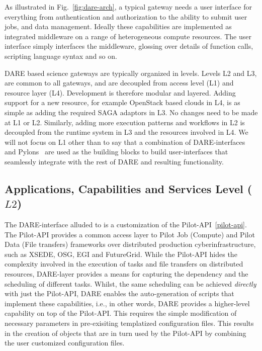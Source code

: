 \documentclass[]{svjour3}
\begin{document}
As illustrated in Fig.~\ref{fig:dare-arch}, a typical gateway needs a
user interface for everything from authentication and authorization to
the ability to submit user jobs, and data management.  Ideally these
capabilities are implemented as integrated middleware on a range of
heterogeneous compute resources. The user interface simply interfaces
the middleware, glossing over details of function calls, scripting
language syntax and so on.

DARE based science gateways are typically organized in levels.  Levels
L2 and L3, are common to all gateways, and are decoupled from access
level (L1) and resource layer (L4). Development is therefore modular
and layered. Adding support for a new resource, for example OpenStack
based clouds in L4, is as simple as adding the required SAGA adaptors
in L3. No changes need to be made at L1 or L2. Similarly, adding more
execution patterns and workflows in L2 is decoupled from the runtime
system in L3 and the resources involved in L4.  We will not focus on
L1 other than to say that a combination of DARE-interfaces and
Pylons~\cite{pylons_website} are used as the building blocks to build
user-interfaces that seamlessly integrate with the rest of DARE and
resulting functionality.





\subsection{Applications, Capabilities and Services Level ($L2$)} 


The DARE-interface alluded to is a customization of the
Pilot-API~\ref{pilot-api}. The Pilot-API provides a common access
layer to Pilot Job (Compute) and Pilot Data (File transfers)
frameworks over distributed production cyberinfrastructure, such as
XSEDE, OSG, EGI and FutureGrid.  While the Pilot-API hides the
complexity involved in the execution of tasks and file transfers on
distributed resources, DARE-layer provides a means for capturing the
dependency and the scheduling of different tasks.  Whilst, the same
scheduling can be achieved {\it directly} with just the Pilot-API,
DARE enables the auto-generation of scripts that implement these
capabilities, i.e., in other words, DARE provides a higher-level
capability on top of the Pilot-API.  This requires the simple
modification of necessary parameters in pre-exisiting templatized
configuration files.  This results in the creation of objects that are
in turn used by the Pilot-API by combining the user customized
configuration files.
\end{document}
